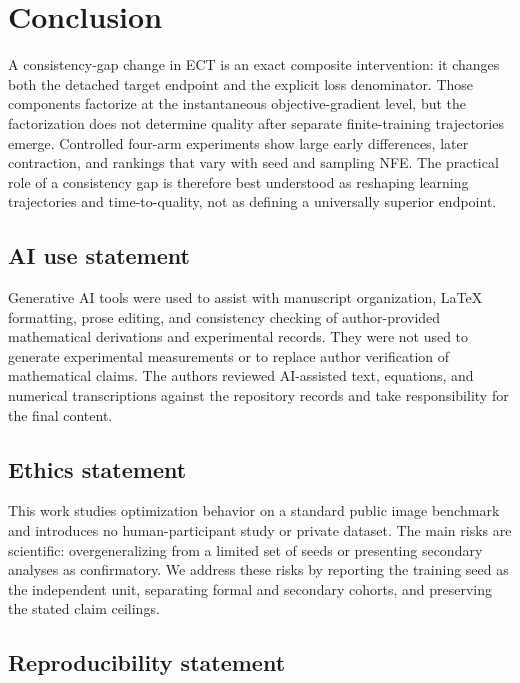 \documentclass{article}
\newif\ifshowcomments
\newcommand{\todo}[1]{%
  \ifshowcomments{\color{todored}\textbf{[TODO: #1]}}\fi}
\begin{document}
\section{Conclusion}
\label{sec:conclusion}

A consistency-gap change in ECT is an exact composite intervention: it changes
both the detached target endpoint and the explicit loss denominator. Those
components factorize at the instantaneous objective-gradient level, but the
factorization does not determine quality after separate finite-training
trajectories emerge. Controlled four-arm experiments show large early
differences, later contraction, and rankings that vary with seed and sampling
NFE. The practical role of a consistency gap is therefore best understood as
reshaping learning trajectories and time-to-quality, not as defining a
universally superior endpoint.

\subsection*{AI use statement}

Generative AI tools were used to assist with manuscript organization, LaTeX
formatting, prose editing, and consistency checking of author-provided
mathematical derivations and experimental records. They were not used to
generate experimental measurements or to replace author verification of
mathematical claims. The authors reviewed AI-assisted text, equations, and
numerical transcriptions against the repository records and take responsibility
for the final content.

\todo{All authors must review this required ICLR 2027 disclosure and add any
other reportable AI uses before submission.}

\subsection*{Ethics statement}

This work studies optimization behavior on a standard public image benchmark
and introduces no human-participant study or private dataset. The main risks
are scientific: overgeneralizing from a limited set of seeds or presenting
secondary analyses as confirmatory. We address these risks by reporting the
training seed as the independent unit, separating formal and secondary cohorts,
and preserving the stated claim ceilings.

\subsection*{Reproducibility statement}
\end{document}
